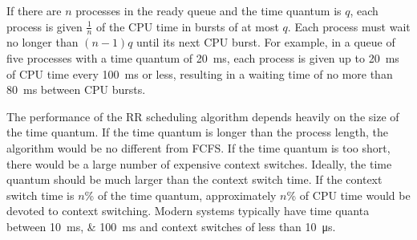 If there are \( n \) processes in the ready queue and the time quantum is \( q \), each process is given \( \frac{1}{n} \) of the CPU time in bursts of at most \( q \).
Each process must wait no longer than \( \left( n - 1 \right) q \) until its next CPU burst.
For example, in a queue of five processes with a time quantum of \SI{20}{\milli\second}, each process is given up to \SI{20}{\milli\second} of CPU time every \SI{100}{\milli\second} or less, resulting in a waiting time of no more than \SI{80}{\milli\second} between CPU bursts.

The performance of the RR scheduling algorithm depends heavily on the size of the time quantum.
If the time quantum is longer than the process length, the algorithm would be no different from FCFS.
If the time quantum is too short, there would be a large number of expensive context switches.
Ideally, the time quantum should be much larger than the context switch time.
If the context switch time is \( n \)\si{\percent} of the time quantum, approximately \( n \)\si{\percent} of CPU time would be devoted to context switching.
Modern systems typically have time quanta between \SIlist{10;100}{\milli\second} and context switches of less than \SI{10}{\micro\second}.
